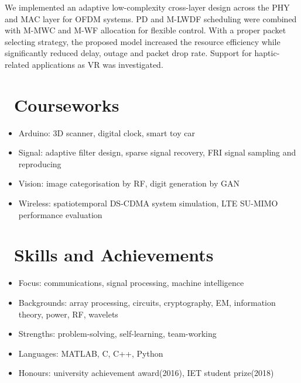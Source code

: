 \documentclass{resume}
\begin{document}
We implemented an adaptive low-complexity cross-layer design across the PHY and MAC layer for OFDM systems. PD and M-LWDF scheduling were combined with M-MWC and M-WF allocation for flexible control. With a proper packet selecting strategy, the proposed model increased the resource efficiency while significantly reduced delay, outage and packet drop rate. Support for haptic-related applications as VR was investigated.

\section{\faTasks\ Courseworks}

\begin{itemize}[noitemsep,nolistsep]
  \item Arduino: 3D scanner, digital clock, smart toy car
  \item Signal: adaptive filter design, sparse signal recovery, FRI signal sampling and reproducing
  \item Vision: image categorisation by RF, digit generation by GAN
  \item Wireless: spatiotemporal DS-CDMA system simulation, LTE SU-MIMO performance evaluation
\end{itemize}

\section{\faHeartO\ Skills and Achievements}

\begin{itemize}[noitemsep,nolistsep]
  \item Focus: communications, signal processing, machine intelligence
  \item Backgrounds: array processing, circuits, cryptography, EM, information theory, power, RF, wavelets 
  \item Strengths: problem-solving, self-learning, team-working
  \item Languages: MATLAB, C, C++, Python
  \item Honours: university achievement award(2016), IET student prize(2018)
\end{itemize}


%
%
\end{document}
